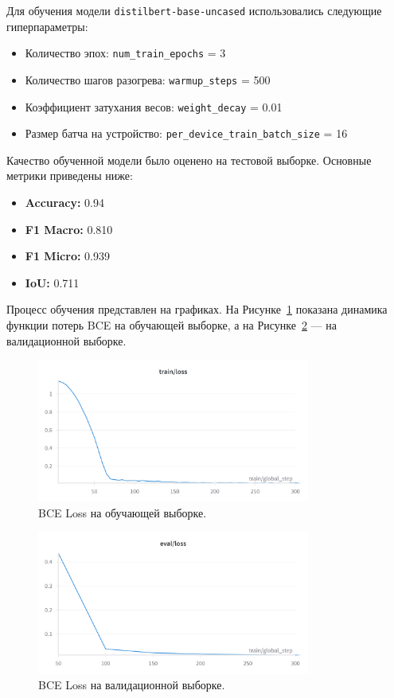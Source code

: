 \documentclass[12pt]{article}
\begin{document}
Для обучения модели \texttt{distilbert-base-uncased} использовались следующие гиперпараметры:
\begin{itemize}
    \item Количество эпох: \texttt{num\_train\_epochs} = 3
    \item Количество шагов разогрева: \texttt{warmup\_steps} = 500
    \item Коэффициент затухания весов: \texttt{weight\_decay} = 0.01
    \item Размер батча на устройство: \texttt{per\_device\_train\_batch\_size} = 16
\end{itemize}


Качество обученной модели было оценено на тестовой выборке. Основные метрики приведены ниже:
\begin{itemize}
\item \textbf{Accuracy:} 0.94
\item \textbf{F1 Macro:} 0.810
\item \textbf{F1 Micro:} 0.939
\item \textbf{IoU:} 0.711
\end{itemize}

Процесс обучения представлен на графиках. На Рисунке~\ref{fig:loss_train} показана динамика функции потерь BCE на обучающей выборке, а на Рисунке~\ref{fig:val_loss} --- на валидационной выборке.
\begin{figure}[h]
\centering
\includegraphics[width=0.8\textwidth]{W&B Chart 22.11.2024, 17_47_03.png}
\caption{BCE Loss на обучающей выборке.}
\label{fig:loss_train}
\end{figure}

\begin{figure}[h]
\centering
\includegraphics[width=0.8\textwidth]{W&B Chart 22.11.2024, 17_48_48.png}
\caption{BCE Loss на валидационной выборке.}
\label{fig:val_loss}
\end{figure}
\end{document}
